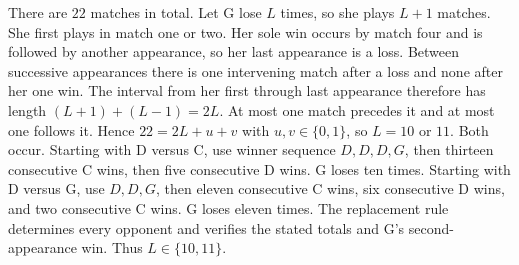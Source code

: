 There are $22$ matches in total. Let G lose $L$ times, so she plays $L+1$ matches. She first plays in match one or two. Her sole win occurs by match four and is followed by another appearance, so her last appearance is a loss. Between successive appearances there is one intervening match after a loss and none after her one win. The interval from her first through last appearance therefore has length $(L+1)+(L-1)=2L$. At most one match precedes it and at most one follows it. Hence $22=2L+u+v$ with $u,v\in\{0,1\}$, so $L=10$ or $11$.
Both occur. Starting with D versus C, use winner sequence $D,D,D,G$, then thirteen consecutive C wins, then five consecutive D wins. G loses ten times. Starting with D versus G, use $D,D,G$, then eleven consecutive C wins, six consecutive D wins, and two consecutive C wins. G loses eleven times. The replacement rule determines every opponent and verifies the stated totals and G's second-appearance win. Thus $\boxed{L\in\{10,11\}}$.
